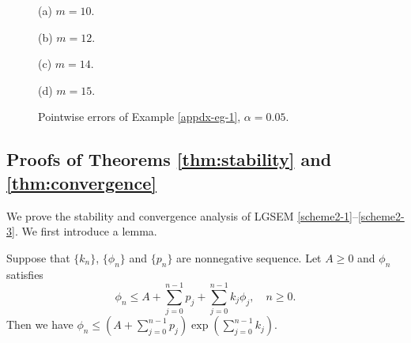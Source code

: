 \documentclass[10pt]{siamltex}
\begin{document}
\begin{figure}[!t]
\begin{center}
\begin{minipage}{0.45\textwidth}\centering
{}   \par{(a)  $m=10$.}
\end{minipage}
\begin{minipage}{0.45\textwidth}\centering
{}  \par{(b)   $m=12$.}
\end{minipage}
\begin{minipage}{0.45\textwidth}\centering
{}   \par{(c) $m=14$.}
\end{minipage}
\begin{minipage}{0.45\textwidth}\centering
{}   \par{(d) $m=15$.}
\end{minipage}
\end{center}
\caption{Pointwise errors of Example \ref{appdx-eg-1},  $\alpha=0.05$.\label{appdx-fig3}}
\end{figure}

\subsection{Proofs of Theorems \ref{thm:stability} and \ref{thm:convergence}}
We prove the stability and convergence analysis of
LGSEM  \eqref{scheme2-1}--\eqref{scheme2-3}.
We first introduce a lemma.
\begin{lemma}\label{lm4.3}
Suppose that $\{k_n\}$, $\{\phi_n\}$ and $\{p_n\}$ are nonnegative sequence. Let $A\geq0$ and
$\phi_n$ satisfies
$$\phi_n\leq A + \sum_{j=0}^{n-1}p_j + \sum_{j=0}^{n-1}k_j\phi_j,{\quad}n\geq0.$$
Then we have
$\phi_n\leq \left(A+\sum_{j=0}^{n-1}p_j\right)\exp\left(\sum_{j=0}^{n-1}k_j\right).$
\end{lemma}
\end{document}
